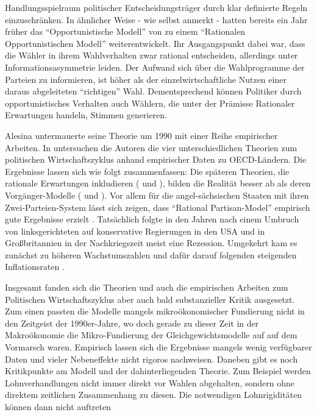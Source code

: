 Handlungsspielraum politischer Entscheidungsträger durch klar definierte Regeln einzuschränken.
In ähnlicher Weise - wie \textcite[S. 671]{Alesina1987} selbst anmerkt - hatten bereits ein Jahr früher \textcite{Rogoff1986} das "`Opportunistische Modell"' von \textcite{Nordhaus1975} zu einem "`Rationalen Opportunistischen Modell"' weiterentwickelt. Ihr Ausgangspunkt dabei war, dass die Wähler in ihrem Wahlverhalten zwar rational entscheiden, allerdings unter Informationsasymmetrie leiden. Der Aufwand sich über die Wahlprogramme der Parteien zu informieren, ist höher als der einzelwirtschaftliche Nutzen einer daraus abgeleiteten "`richtigen"' Wahl. Dementsprechend können Politiker durch opportunistisches Verhalten auch Wählern, die unter der Prämisse Rationaler Erwartungen handeln, Stimmen generieren.

Alesina untermauerte seine Theorie um 1990 mit einer Reihe empirischer Arbeiten. In \textcite{Alesina1992} untersuchen die Autoren die vier unterschiedlichen Theorien zum politischen Wirtschaftszyklus anhand empirischer Daten zu OECD-Ländern. Die Ergebnisse lassen sich wie folgt zusammenfassen: Die späteren Theorien, die rationale Erwartungen inkludieren (\parencite{Alesina1987} und \parencite{Rogoff1986}), bilden die Realität besser ab als deren Vorgänger-Modelle (\parencite{Nordhaus1975} und \textcite{Hibbs1977}). Vor allem für die angel-sächsischen Staaten mit ihren Zwei-Parteien-System lässt sich zeigen, dass "`Rational Partisan-Model"' empirisch gute Ergebnisse erzielt \parencite[S. 95]{Alesina1992}. Tatsächlich folgte in den Jahren nach einem Umbruch von linksgerichteten auf konservative Regierungen in den USA und in Großbritannien in der Nachkriegszeit meist eine Rezession. Umgekehrt kam es zunächst zu höheren Wachstumszahlen und dafür darauf folgenden steigenden Inflationsraten \parencite[S. 96]{Alesina1992}.

Insgesamt fanden sich die Theorien und auch die empirischen Arbeiten zum Politischen Wirtschaftszyklus aber auch bald substanzieller Kritik ausgesetzt. Zum einen passten die Modelle mangels mikroökonomischer Fundierung nicht in den Zeitgeist der 1990er-Jahre, wo doch gerade zu dieser Zeit in der Makroökonomie die Mikro-Fundierung der Gleichgewichtsmodelle auf auf dem Vormarsch waren. Empirisch lassen sich die Ergebnisse mangels wenig verfügbarer Daten und vieler Nebeneffekte nicht rigoros nachweisen. Daneben gibt es noch Kritikpunkte am Modell und der dahinterliegenden Theorie. Zum Beispiel werden Lohnverhandlungen nicht immer direkt vor Wahlen abgehalten, sondern ohne direktem zeitlichen Zusammenhang zu diesen. Die notwendigen Lohnrigiditäten können dann nicht auftreten \parencite[S. 544]{Snowdon2005}


